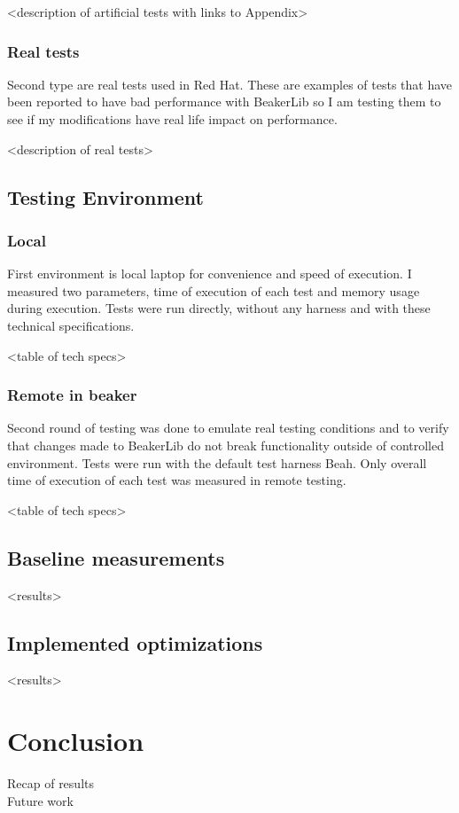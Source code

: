 <description of artificial tests with links to Appendix>

\subsection{Real tests}
Second type are real tests used in Red Hat. These are examples of tests that have been reported to have bad performance with BeakerLib so I am testing them to see if my modifications have real life impact on performance.

<description of real tests>

\section{Testing Environment}

\subsection{Local}
First environment is local laptop for convenience and speed of execution. I measured  two parameters, time of execution of each test and memory usage during execution. Tests were run directly, without any harness and with these technical specifications. 

<table of tech specs>

\subsection{Remote in beaker}
Second round of testing was done to emulate real testing conditions and to verify that changes made to BeakerLib do not break functionality outside of controlled environment. Tests were run with the default test harness Beah. Only overall time of execution of each test was measured in remote testing.

<table of tech specs>

\section{Baseline measurements}
<results>


\section{Implemented optimizations}
<results>

\chapter{Conclusion}
Recap of results
\\
Future work


